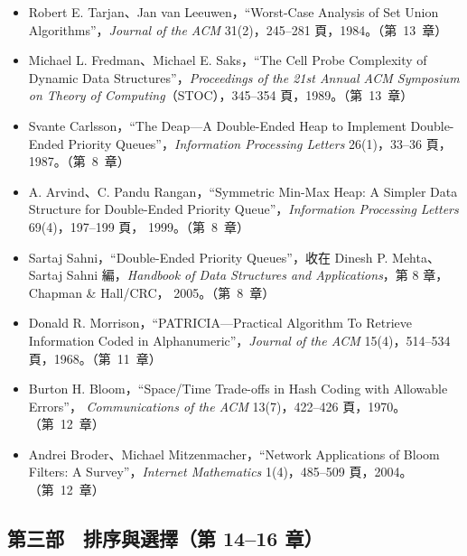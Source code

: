 \begin{itemize}
\textit{Journal of the ACM} 22(2)，215--225 頁，1975。（第~13~章）
\item Robert E. Tarjan、Jan van Leeuwen，``Worst-Case Analysis of Set Union
Algorithms''，\textit{Journal of the ACM} 31(2)，245--281 頁，1984。（第~13~章）
\item Michael L. Fredman、Michael E. Saks，``The Cell Probe Complexity of Dynamic Data
Structures''，\textit{Proceedings of the 21st Annual ACM Symposium on Theory of
Computing}（STOC），345--354 頁，1989。（第~13~章）
\item Svante Carlsson，``The Deap---A Double-Ended Heap to Implement Double-Ended Priority
Queues''，\textit{Information Processing Letters} 26(1)，33--36 頁，1987。（第~8~章）
\item A. Arvind、C. Pandu Rangan，``Symmetric Min-Max Heap: A Simpler Data Structure for
Double-Ended Priority Queue''，\textit{Information Processing Letters} 69(4)，197--199 頁，
1999。（第~8~章）
\item Sartaj Sahni，``Double-Ended Priority Queues''，收在 Dinesh P. Mehta、Sartaj Sahni
編，\textit{Handbook of Data Structures and Applications}，第 8 章，Chapman \& Hall/CRC，
2005。（第~8~章）
\item Donald R. Morrison，``PATRICIA---Practical Algorithm To Retrieve Information Coded in
Alphanumeric''，\textit{Journal of the ACM} 15(4)，514--534 頁，1968。（第~11~章）
\item Burton H. Bloom，``Space/Time Trade-offs in Hash Coding with Allowable Errors''，
\textit{Communications of the ACM} 13(7)，422--426 頁，1970。（第~12~章）
\item Andrei Broder、Michael Mitzenmacher，``Network Applications of Bloom Filters: A
Survey''，\textit{Internet Mathematics} 1(4)，485--509 頁，2004。（第~12~章）
\end{itemize}

\subsection*{第三部　排序與選擇（第 14--16 章）}

